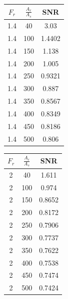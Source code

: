 \documentclass[12pt, a4paper] {ncc}
\begin{document}
\begin{table}[H]
            \begin{tabular} { |c|c|c| }
                \hline
                \textbf{$F_r$} & \textbf{$\frac{A_r} {A_s}$} & \textbf{SNR} \\ \hline
                        1.4 &  40  & 3.03 \\ \hline
                        1.4 &  100 & 1.4402 \\ \hline
                        1.4 &  150 & 1.138 \\ \hline
                        1.4 &  200 & 1.005 \\ \hline
                        1.4 &  250 & 0.9321 \\ \hline
                        1.4 &  300 & 0.887 \\ \hline
                        1.4 &  350 & 0.8567 \\ \hline
                        1.4 &  400 & 0.8349 \\ \hline
                        1.4 &  450 & 0.8186 \\ \hline
                        1.4 &  500 & 0.806 \\ \hline
            \end{tabular}
            \begin{tabular} { |c|c|c| }
                \hline
                \textbf{$F_r$} & \textbf{$\frac{A_r} {A_s}$} & \textbf{SNR} \\ \hline
                    2 & 40  & 1.611 \\ \hline
                    2 & 100 & 0.974 \\ \hline
                    2 & 150 & 0.8652 \\ \hline
                    2 & 200 & 0.8172 \\ \hline
                    2 & 250 & 0.7906 \\ \hline
                    2 & 300 & 0.7737 \\ \hline
                    2 & 350 & 0.7622 \\ \hline
                    2 & 400 & 0.7538 \\ \hline
                    2 & 450 & 0.7474 \\ \hline
                    2 & 500 & 0.7424 \\ \hline
            \end{tabular}
        \end{table}
\end{document}
